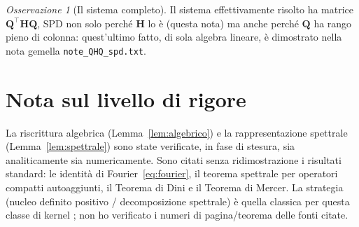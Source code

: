 \documentclass[11pt,a4paper]{article}
\theoremstyle{plain}
\theoremstyle{remark}
\newtheorem*{osservazione}{Osservazione}
\newcommand{\Hmat}{\mathbf{H}}
\newcommand{\Qmat}{\mathbf{Q}}
\newcommand{\transp}{^{\!\top}}
\begin{document}
\begin{osservazione}[Il sistema completo]
Il sistema effettivamente risolto ha matrice $\Qmat\transp\Hmat\Qmat$, SPD non solo perch\'e
$\Hmat$ lo \`e (questa nota) ma anche perch\'e $\Qmat$ ha rango pieno di colonna: quest'ultimo
fatto, di sola algebra lineare, \`e dimostrato nella nota gemella \texttt{note\_QHQ\_spd.txt}.
\end{osservazione}

\section*{Nota sul livello di rigore}
La riscrittura algebrica (Lemma~\ref{lem:algebrico}) e la rappresentazione spettrale
(Lemma~\ref{lem:spettrale}) sono state verificate, in fase di stesura, sia analiticamente sia
numericamente. Sono citati senza ridimostrazione i risultati standard: le identit\`a di
Fourier~\eqref{eq:fourier}, il teorema spettrale per operatori compatti autoaggiunti, il Teorema
di Dini e il Teorema di Mercer. La strategia (nucleo definito positivo / decomposizione spettrale)
\`e quella classica per questa classe di kernel \cite{aronszajn1950,wahba1990,fasshauer2007};
non ho verificato i numeri di pagina/teorema delle fonti citate.
\end{document}
